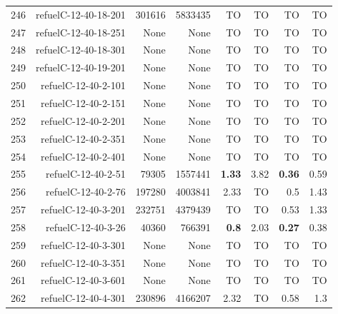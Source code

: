 \begin{longtable}{lrr@{\hskip 12pt}r@{\hskip 12pt}r@{\hskip 12pt}r@{\hskip 12pt}r@{\hskip 12pt}r}
246 & \multirow{1}{*}{refuelC-12-40-18-201} & \multirow{1}{*}{301616} & \multirow{1}{*}{5833435} & TO & TO & TO & TO \\
247 & \multirow{1}{*}{refuelC-12-40-18-251} & \multirow{1}{*}{None} & \multirow{1}{*}{None} & TO & TO & TO & TO \\
248 & \multirow{1}{*}{refuelC-12-40-18-301} & \multirow{1}{*}{None} & \multirow{1}{*}{None} & TO & TO & TO & TO \\
249 & \multirow{1}{*}{refuelC-12-40-19-201} & \multirow{1}{*}{None} & \multirow{1}{*}{None} & TO & TO & TO & TO \\
250 & \multirow{1}{*}{refuelC-12-40-2-101} & \multirow{1}{*}{None} & \multirow{1}{*}{None} & TO & TO & TO & TO \\
251 & \multirow{1}{*}{refuelC-12-40-2-151} & \multirow{1}{*}{None} & \multirow{1}{*}{None} & TO & TO & TO & TO \\
252 & \multirow{1}{*}{refuelC-12-40-2-201} & \multirow{1}{*}{None} & \multirow{1}{*}{None} & TO & TO & TO & TO \\
253 & \multirow{1}{*}{refuelC-12-40-2-351} & \multirow{1}{*}{None} & \multirow{1}{*}{None} & TO & TO & TO & TO \\
254 & \multirow{1}{*}{refuelC-12-40-2-401} & \multirow{1}{*}{None} & \multirow{1}{*}{None} & TO & TO & TO & TO \\
255 & \multirow{1}{*}{refuelC-12-40-2-51} & \multirow{1}{*}{79305} & \multirow{1}{*}{1557441} & \textbf{1.33} & 3.82 & \textbf{0.36} & 0.59 \\
256 & \multirow{1}{*}{refuelC-12-40-2-76} & \multirow{1}{*}{197280} & \multirow{1}{*}{4003841} & 2.33 & TO & 0.5 & 1.43 \\
257 & \multirow{1}{*}{refuelC-12-40-3-201} & \multirow{1}{*}{232751} & \multirow{1}{*}{4379439} & TO & TO & 0.53 & 1.33 \\
258 & \multirow{1}{*}{refuelC-12-40-3-26} & \multirow{1}{*}{40360} & \multirow{1}{*}{766391} & \textbf{0.8} & 2.03 & \textbf{0.27} & 0.38 \\
259 & \multirow{1}{*}{refuelC-12-40-3-301} & \multirow{1}{*}{None} & \multirow{1}{*}{None} & TO & TO & TO & TO \\
260 & \multirow{1}{*}{refuelC-12-40-3-351} & \multirow{1}{*}{None} & \multirow{1}{*}{None} & TO & TO & TO & TO \\
261 & \multirow{1}{*}{refuelC-12-40-3-601} & \multirow{1}{*}{None} & \multirow{1}{*}{None} & TO & TO & TO & TO \\
262 & \multirow{1}{*}{refuelC-12-40-4-301} & \multirow{1}{*}{230896} & \multirow{1}{*}{4166207} & 2.32 & TO & 0.58 & 1.3 \\

\end{longtable}
